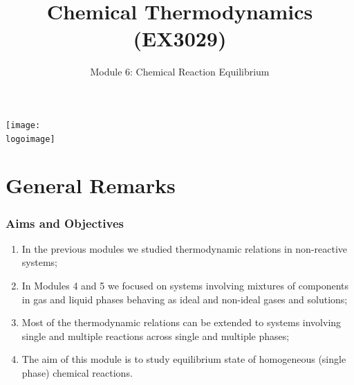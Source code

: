 \documentclass[10pt,compress,unknownkeysallowed]{beamer}
\institute{School of Engineering}
\title{Chemical Thermodynamics (EX3029)}
\subtitle{Module 6: Chemical Reaction Equilibrium}
\date[ ]{ }
\newcommand{\logoimage}{../../FigBanner/UoAHorizBanner}
\begin{document}
\begin{frame}
  \titlepage
  \vfill%
  \begin{center}
    \texttt{[image: \\logoimage]}
  \end{center}
\end{frame}




\section{General Remarks}

\begin{frame}
 \frametitle{Aims and Objectives}
   \begin{enumerate}
     \item<1-> In the previous modules we studied thermodynamic relations in non-reactive systems;
     \item<1-> In Modules 4 and 5 we focused on systems involving mixtures of components in gas and liquid phases behaving as ideal and non-ideal gases and solutions;
     \item<2-> Most of the thermodynamic relations can be extended to systems involving single and multiple reactions across single and multiple phases;
     \item<2-> The aim of this module is to study equilibrium state of homogeneous (\ie single phase) chemical reactions.
   \end{enumerate}
\end{frame}


\end{document}
